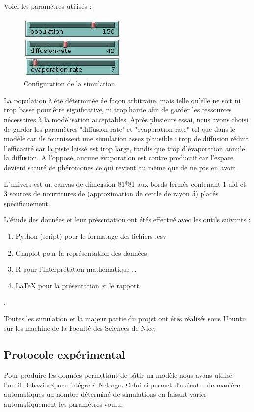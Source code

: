\documentclass{article}
\begin{document}
Voici les paramètres utilisés :
\begin{figure}[H]
\centering
\includegraphics[scale=0.6]{contenue/settings2.jpg} 
\caption{Configuration de la simulation}
\label{fig:Tas}
\end{figure}

La population à été déterminée de façon arbitraire, mais telle qu'elle ne soit ni trop basse pour être significative, ni trop haute afin de garder les ressources nécessaires à la modélisation acceptables. Après plusieurs essai, nous avons choisi de garder les paramètres "diffusion-rate" et "evaporation-rate" tel que dans le modèle car ils fournissent une simulation assez plausible : trop de diffusion réduit l'efficacité car la piste laissé est trop large, tandis que trop d'évaporation annule la diffusion. A l'opposé, aucune évaporation est contre productif car l'espace devient saturé de phéromones ce qui revient au même que de ne pas en avoir.

L'univers est un canvas de dimension 81*81 aux bords fermés contenant 1 nid et 3 sources de nourritures de (approximation de cercle de rayon 5) placés spécifiquement.

L'étude des données et leur présentation ont étés effectué avec les outils suivants :
\begin{enumerate}  
\item Python (script) pour le formatage des fichiers .csv
\item Gnuplot pour la représentation des données.
\item R pour l'interprétation mathématique  \ldots 
\item \LaTeX\xspace pour la présentation et le rapport %
\end{enumerate}.

Toutes les simulation et la majeur partie du projet ont étés réalisés sous Ubuntu sur les machine de la Faculté des Sciences de Nice. 


\label{pourcentage}

\subsection{Protocole expérimental}
Pour produire les données permettant de bâtir un modèle nous avons utilisé l'outil BehaviorSpace intégré à Netlogo. Celui ci permet d'exécuter de manière automatiques un nombre déterminé de simulations en faisant varier automatiquement les paramètres voulu.
\end{document}
